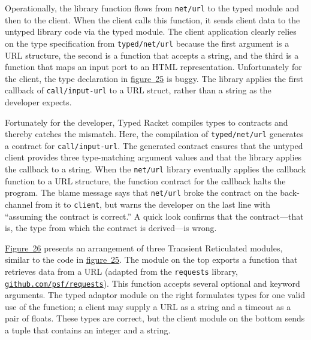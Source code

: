 \documentclass[ twoside,open=right,titlepage,numbers=noenddot,headinclude,%
                footinclude=true,cleardoublepage=empty,abstract=off,
                BCOR=5mm,paper=a4,fontsize=11pt,%
                ngerman,american,%
                parts,pdfspacing]{scrreprt}
\newcommand{\Scribtexttt}[1]{{\texttt{#1}}}
\newcommand{\FigureRef}[2]{#1}
\begin{document}
Operationally, the library function flows from \Scribtexttt{net/url}
 to the typed module and then to the client.
When the client calls this function, it sends
 client data to the untyped library code via the typed module.
The client application clearly relies on the type specification from \Scribtexttt{typed/net/url} because
 the first argument is a URL structure,
 the second is a function that accepts a string,
 and the third is a function that maps an input port to an HTML representation.
Unfortunately for the client, the type declaration in \hyperref[t:x28counter_x28x22figurex22_x22figx3atrx2dexamplex22x29x29]{figure~\FigureRef{25}{t:x28counter_x28x22figurex22_x22figx3atrx2dexamplex22x29x29}}
 is buggy.
The library applies the first callback of
 \Scribtexttt{call/input{-}url} to a URL struct,
 rather than a string as the developer expects.

Fortunately for the developer, Typed Racket compiles types to contracts and
 thereby catches the mismatch.
Here, the compilation of \Scribtexttt{typed/net/url} generates a
 contract for \Scribtexttt{call/input{-}url}.
The generated contract ensures that the untyped client provides three
 type{-}matching argument values and that the library applies the callback to a
 string.
When the \Scribtexttt{net/url} library eventually applies the callback
 function to a URL structure, the function contract for the callback halts
 the program.
The blame message says that \Scribtexttt{net/url} broke the
 contract on the back{-}channel from it to \Scribtexttt{client}, but warns the
 developer on the last line with {``}assuming the contract is correct.{''}
A quick look confirms that the contract{---}that is, the type
 from which the contract is derived{---}is wrong.

\hyperref[t:x28counter_x28x22figurex22_x22figx3areticx2dexamplex22x29x29]{Figure~\FigureRef{26}{t:x28counter_x28x22figurex22_x22figx3areticx2dexamplex22x29x29}} presents an arrangement of three Transient
 Reticulated modules, similar to the code in \hyperref[t:x28counter_x28x22figurex22_x22figx3atrx2dexamplex22x29x29]{figure~\FigureRef{25}{t:x28counter_x28x22figurex22_x22figx3atrx2dexamplex22x29x29}}.
The module on the top exports a function that retrieves data from a URL
(adapted from the \Scribtexttt{requests} library, \href{https://github.com/psf/requests}{\Scribtexttt{github{\hbox{\texttt{.}}}com/psf/requests}}).
This function accepts several optional and keyword arguments.
The typed adaptor module on the right formulates types for one valid use of the
 function; a client may supply a URL as a string and a timeout as a pair of floats.
These types are correct, but the client module on the bottom sends
 a tuple that contains an integer and a string.
\end{document}
